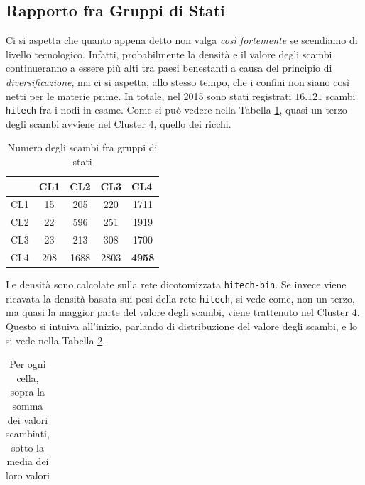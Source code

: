 \documentclass[]{article}
\begin{document}
\begin{multicols}{2}
	\subsection{Rapporto fra Gruppi di Stati}
	Ci si aspetta che quanto appena detto non valga \textit{così fortemente} se scendiamo di livello tecnologico. Infatti, probabilmente la densità e il valore degli scambi continueranno a essere più alti tra paesi benestanti a causa del principio di \textit{diversificazione}, ma ci si aspetta, allo stesso tempo, che i confini non siano così netti per le materie prime. In totale, nel 2015 sono stati registrati $16.121$ scambi \texttt{hitech} fra i nodi in esame. Come si può vedere nella Tabella \ref{tab:scambi-cluster}, quasi un terzo degli scambi avviene nel Cluster 4, quello dei ricchi.
	\begin{table}[H]
		\centering
		\caption{Numero degli scambi fra gruppi di stati}
		\label{tab:scambi-cluster}
		\begin{tabular}{@{}lcccc@{}}
			\toprule
			& \multicolumn{1}{l}{CL1} & \multicolumn{1}{l}{CL2} & \multicolumn{1}{l}{CL3} & \multicolumn{1}{l}{CL4} \\ \midrule
			CL1 & 15                      & 205                     & 220                     & 1711                    \\
			CL2 & 22                      & 596                     & 251                     & 1919                    \\
			CL3 & 23                      & 213                     & 308                     & 1700                    \\
			CL4 & 208                     & 1688                    & 2803                    & \textbf{4958}                    \\ \bottomrule
		\end{tabular}
	\end{table}
	Le densità sono calcolate sulla rete dicotomizzata \texttt{hitech-bin}. Se invece viene ricavata la densità basata sui pesi della rete \texttt{hitech}, si vede come, non un terzo, ma quasi la maggior parte del valore degli scambi, viene trattenuto nel Cluster 4. Questo si intuiva all'inizio, parlando di distribuzione del valore degli scambi, e lo si vede nella Tabella \ref{tab:scambi-valore-cluster}.
	\begin{table}[H]
		\centering
		\caption{Per ogni cella, sopra la somma dei valori scambiati, sotto la media dei loro valori}
		\label{tab:scambi-valore-cluster}
		\begin{tabular}{@{}lrrrr@{}}

\end{tabular}
\end{table}
\end{multicols}
\end{document}

